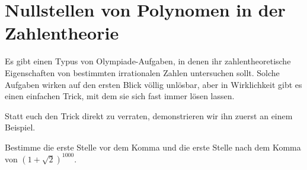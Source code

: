 \section{Nullstellen von Polynomen in der Zahlentheorie}\label{kapitel:Galois}
Es gibt einen Typus von Olympiade-Aufgaben, in denen ihr zahlentheoretische Eigenschaften von bestimmten irrationalen Zahlen untersuchen sollt. Solche Aufgaben wirken auf den ersten Blick völlig unlösbar, aber in Wirklichkeit gibt es einen einfachen Trick, mit dem sie sich fast immer lösen lassen.

Statt euch den Trick direkt zu verraten, demonstrieren wir ihn zuerst an einem Beispiel.
\begin{aufgabe*}\label{aufgabe:1+sqrt2Hoch1000}
	Bestimme die erste Stelle vor dem Komma und die erste Stelle nach dem Komma von $(1+\sqrt{2})^{1000}$.
\end{aufgabe*}
